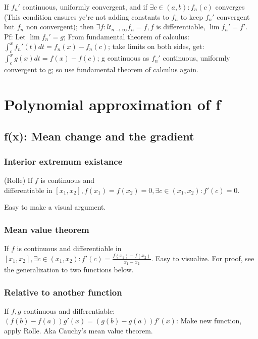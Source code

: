\documentclass[oneside, article]{memoir}
\begin{document}
If $f_{n}'$ continuous, uniformly convergent, and if $\exists c \in (a, b): f_{n}(c)$ converges (This condition ensures ye're not adding constants to $f_{n}$ to keep $f_{n}'$ convergent but $f_{n}$ non convergent); then $\exists f: lt_{n \to \infty} f_{n} = f, f$ is differentiable, $\lim f_{n}' = f'$. Pf: Let $\lim  f_{n}' = g$; From fundamental theorem of calculus: $\int_{c}^{x}f_{n}'(t)dt = f_{n}(x) - f_{n}(c)$; take limits on both sides, get: $\int_{c}^{x} g(x)dt = f(x) -f(c)$; g continuous as $f_{n}'$ continuous, uniformly convergent to g; so use fundamental theorem of calculus again.

\section{Polynomial approximation of f}
\subsection{f(x): Mean change and the gradient}
\subsubsection{Interior extremum existance}
(Rolle) If $f$ is continuous and \\
differentiable in $[x_{1}, x_{2}], f(x_{1}) = f(x_{2}) = 0, \exists c \in (x_{1}, x_{2}): f'(c) =0$. 

Easy to make a visual argument.


\subsubsection{Mean value theorem}
If $f$ is continuous and differentiable in \\
$[x_{1}, x_{2}], \exists c \in (x_{1}, x_{2}): f'(c) = \frac{f(x_{1})- f(x_{2})}{x_{1} - x_{2}}$. Easy to visualize. For proof, see the generalization to two functions below.


\subsubsection{Relative to another function}
If $f, g$ continuous and differentiable: $(f(b) - f(a)) g'(x) = (g(b) - g(a)) f'(x)$: Make new function, apply Rolle. Aka Cauchy's mean value theorem.
\end{document}
